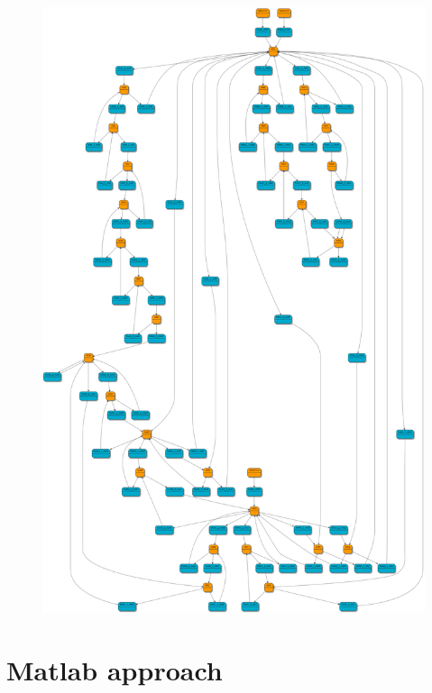 \documentclass[a4paper]{article}
\begin{document}
\begin{figure}[h]
\centering
\includegraphics[scale=0.12]{schemas/img4.png}
\caption{\label{fig:img4}}
\end{figure}

\clearpage

%
\section{Matlab approach}
\label{cha:matlabApproach}

\end{document}
